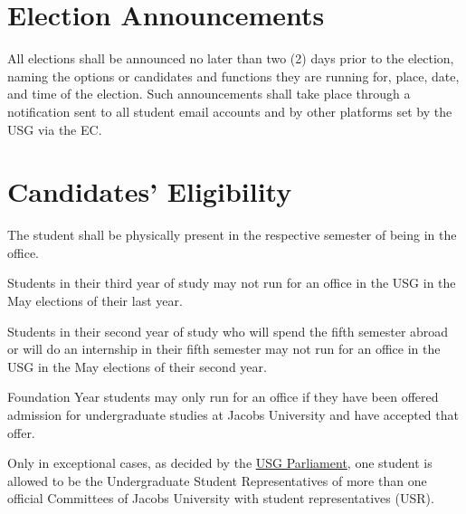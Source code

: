 \section{Election Announcements} 
All elections shall be announced no later than two (2) days prior to the election, naming the options or candidates and functions they are running for, place, date, and time of the election. Such announcements shall take place through a notification sent to all student email accounts and by other platforms set by the USG via the EC.

\section{Candidates' Eligibility}
The student shall be physically present in the respective semester of being in the office.
\begin{parenum}
\item
Students in their third year of study may not run for an office in the USG in the May elections of their last year.

\item
Students in their second year of study who will spend the fifth semester abroad or will do an internship in their fifth semester may not run for an office in the USG in the May elections of their second year.

\item
Foundation Year students may only run for an office if they have been offered admission for undergraduate studies at Jacobs University and have accepted that offer.

\item 
Only in exceptional cases, as decided by the \hyperref[USGParliamentDef]{USG Parliament}, one student is allowed to be the Undergraduate Student Representatives of more than one official Committees of Jacobs University with student representatives (USR).

\end{parenum}

